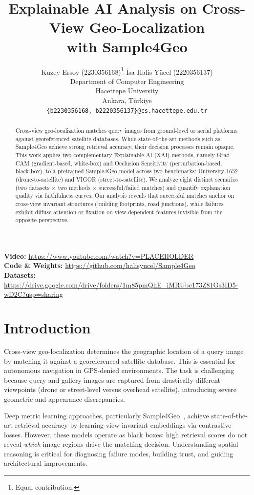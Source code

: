 \documentclass{article}
\title{Explainable AI Analysis on Cross-View Geo-Localization\\with Sample4Geo}
\author{
Kuzey Ersoy (2230356168)\thanks{Equal contribution.} \quad \.{I}sa Halis Y\"{u}cel (2220356137)\footnotemark[1] \\
Department of Computer Engineering\\
Hacettepe University\\
Ankara, T\"{u}rkiye\\
\texttt{\{b2230356168, b2220356137\}@cs.hacettepe.edu.tr}
}
\begin{document}
\maketitle

\vspace{-0.5em}
\noindent\textbf{Video:} \url{https://www.youtube.com/watch?v=PLACEHOLDER}\\
\textbf{Code \& Weights:} \url{https://github.com/halisyucel/Sample4Geo}\\
\textbf{Datasets:} \url{https://drive.google.com/drive/folders/1m85pmQhE_iMRUbc173Z81Gs3ID5-wD2C?usp=sharing}

\begin{abstract}
Cross-view geo-localization matches query images from ground-level or aerial platforms against georeferenced satellite databases.
While state-of-the-art methods such as Sample4Geo achieve strong retrieval accuracy, their decision processes remain opaque.
This work applies two complementary Explainable AI (XAI) methods, namely Grad-CAM (gradient-based, white-box) and Occlusion Sensitivity (perturbation-based, black-box), to a pretrained Sample4Geo model across two benchmarks: University-1652 (drone-to-satellite) and VIGOR (street-to-satellite).
We analyze eight distinct scenarios (two datasets $\times$ two methods $\times$ successful/failed matches) and quantify explanation quality via faithfulness curves.
Our analysis reveals that successful matches anchor on cross-view invariant structures (building footprints, road junctions), while failures exhibit diffuse attention or fixation on view-dependent features invisible from the opposite perspective.
\end{abstract}

\section{Introduction}
\label{sec:intro}

Cross-view geo-localization determines the geographic location of a query image by matching it against a georeferenced satellite database.
This is essential for autonomous navigation in GPS-denied environments.
The task is challenging because query and gallery images are captured from drastically different viewpoints (drone or street-level versus overhead satellite), introducing severe geometric and appearance discrepancies.

Deep metric learning approaches, particularly Sample4Geo~\citep{deuser2023sample4geo}, achieve state-of-the-art retrieval accuracy by learning view-invariant embeddings via contrastive losses.
However, these models operate as black boxes: high retrieval scores do not reveal \emph{which} image regions drive the matching decision.
Understanding spatial reasoning is critical for diagnosing failure modes, building trust, and guiding architectural improvements.
\end{document}
